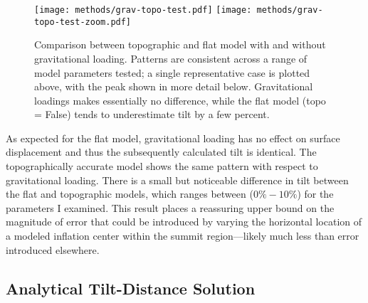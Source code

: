 \begin{figure}
    \texttt{[image: methods/grav-topo-test.pdf]}
    \texttt{[image: methods/grav-topo-test-zoom.pdf]}%
    \caption[Numerical model sensitivity to topography and gravity]{Comparison between topographic and flat model with and without gravitational loading. Patterns are consistent across a range of model parameters tested; a single representative case is plotted above, with the peak shown in more detail below. Gravitational loadings makes essentially no difference, while the flat model (topo = False) tends to underestimate tilt by a few percent.}%
    \label{fig:grav-topo-test}%
\end{figure}

As expected for the flat model, gravitational loading has no effect on surface displacement and thus the subsequently calculated tilt is identical. The topographically accurate model shows the same pattern with respect to gravitational loading. There is a small but noticeable difference in tilt between the flat and topographic models, which ranges between ($0\%-10\%$) for the parameters I examined. This result places a reassuring upper bound on the magnitude of error that could be introduced by varying the horizontal location of a modeled inflation center within the summit region---likely much less than error introduced elsewhere.

\subsection{Analytical Tilt-Distance Solution}\label{sec:analytical-tilt-solution}

